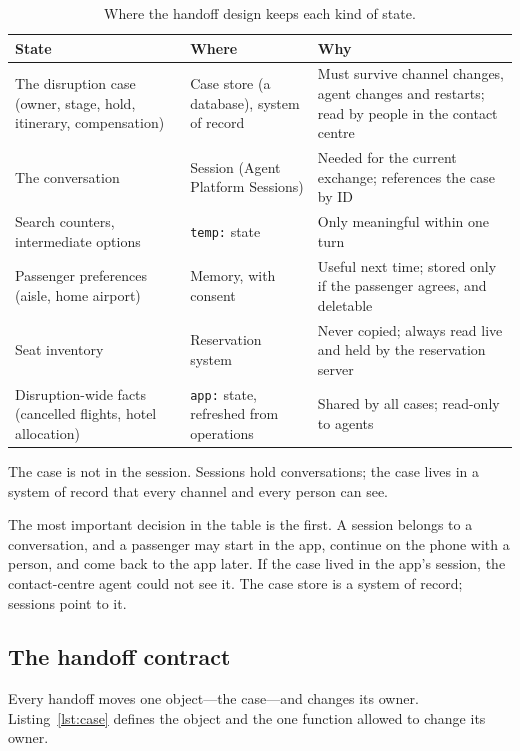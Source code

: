 \begin{table}[htbp]
\centering
\small
\caption{Where the handoff design keeps each kind of state.}
\label{tab:air-state}
\begin{tabularx}{\textwidth}{@{}>{\raggedright\arraybackslash}p{3.3cm}>{\raggedright\arraybackslash}p{3.4cm}>{\raggedright\arraybackslash}X@{}}
\toprule
\rowcolor{coHead} State & Where & Why \\
\midrule
The disruption case (owner, stage, hold, itinerary, compensation) & Case store (a database), system of record & Must survive channel changes, agent changes and restarts; read by people in the contact centre \\
The conversation & Session (Agent Platform Sessions) & Needed for the current exchange; references the case by ID \\
Search counters, intermediate options & \texttt{temp:} state & Only meaningful within one turn \\
Passenger preferences (aisle, home airport) & Memory, with consent & Useful next time; stored only if the passenger agrees, and deletable \\
Seat inventory & Reservation system & Never copied; always read live and held by the reservation server \\
Disruption-wide facts (cancelled flights, hotel allocation) & \texttt{app:} state, refreshed from operations & Shared by all cases; read-only to agents \\
\bottomrule
\end{tabularx}
\end{table}

\begin{keyidea}
The case is not in the session. Sessions hold conversations; the case lives in a system of record that every channel and every person can see.
\end{keyidea}

The most important decision in the table is the first. A session belongs to a conversation, and a passenger may start in the app, continue on the phone with a person, and come back to the app later. If the case lived in the app's session, the contact-centre agent could not see it. The case store is a system of record; sessions point to it.

\subsection{The handoff contract}

Every handoff moves one object---the case---and changes its owner. Listing~\ref{lst:case} defines the object and the one function allowed to change its owner.

